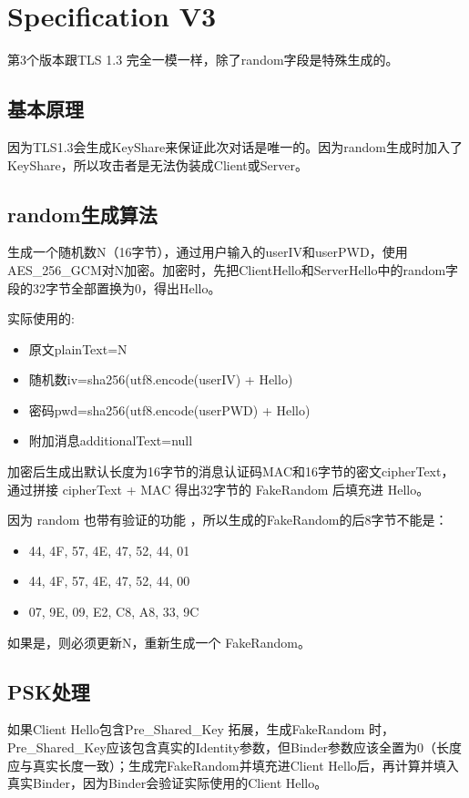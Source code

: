\chapter{Specification V3}
第3个版本跟TLS 1.3 完全一模一样，除了random字段是特殊生成的。

\section{基本原理}
因为TLS1.3会生成KeyShare来保证此次对话是唯一的。因为random生成时加入了KeyShare，所以攻击者是无法伪装成Client或Server。

\section{random生成算法}
生成一个随机数N（16字节），通过用户输入的userIV和userPWD，使用AES\_256\_GCM对N加密。加密时，先把ClientHello和ServerHello中的random字段的32字节全部置换为0，得出Hello。

实际使用的:
\begin{itemize}
	\item 原文plainText=N
	\item 随机数iv=sha256(utf8.encode(userIV) + Hello)
	\item 密码pwd=sha256(utf8.encode(userPWD) + Hello)
	\item 附加消息additionalText=null
\end{itemize}

加密后生成出默认长度为16字节的消息认证码MAC和16字节的密文cipherText，通过拼接 cipherText + MAC 得出32字节的 FakeRandom 后填充进 Hello。

因为 random 也带有验证的功能 \cite{rescorla2018transport}，所以生成的FakeRandom的后8字节不能是：

\begin{itemize}
	\item 44, 4F, 57, 4E, 47, 52, 44, 01
	\item 44, 4F, 57, 4E, 47, 52, 44, 00
	\item 07, 9E, 09, E2, C8, A8, 33, 9C
\end{itemize}

如果是，则必须更新N，重新生成一个 FakeRandom。


\section{PSK处理}
如果Client Hello包含Pre\_Shared\_Key 拓展，生成FakeRandom 时，Pre\_Shared\_Key应该包含真实的Identity参数，但Binder参数应该全置为0（长度应与真实长度一致）；生成完FakeRandom并填充进Client Hello后，再计算并填入真实Binder，因为Binder会验证实际使用的Client Hello。

